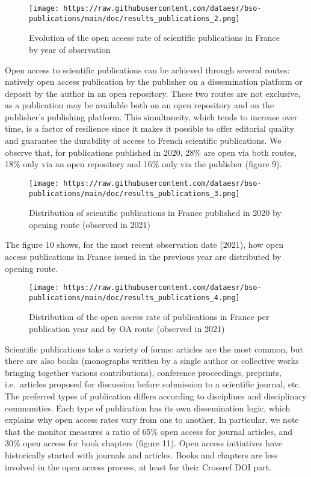\documentclass[
]{article}
\begin{document}
\begin{figure}
\centering
\texttt{[image: https://raw.githubusercontent.com/dataesr/bso-publications/main/doc/results\_publications\_2.png]}
\caption{Evolution of the open access rate of scientific publications in
France by year of observation}
\end{figure}

Open access to scientific publications can be achieved through several
routes: natively open access publication by the publisher on a
dissemination platform or deposit by the author in an open repository.
These two routes are not exclusive, as a publication may be available
both on an open repository and on the publisher's publishing platform.
This simultaneity, which tends to increase over time, is a factor of
resilience since it makes it possible to offer editorial quality and
guarantee the durability of access to French scientific publications. We
observe that, for publications published in 2020, 28\% are open via both
routes, 18\% only via an open repository and 16\% only via the publisher
(figure 9).

\begin{figure}
\centering
\texttt{[image: https://raw.githubusercontent.com/dataesr/bso-publications/main/doc/results\_publications\_3.png]}
\caption{Distribution of scientific publications in France published in
2020 by opening route (observed in 2021)}
\end{figure}

The figure 10 shows, for the most recent observation date (2021), how
open access publications in France issued in the previous year are
distributed by opening route.

\begin{figure}
\centering
\texttt{[image: https://raw.githubusercontent.com/dataesr/bso-publications/main/doc/results\_publications\_4.png]}
\caption{Distribution of the open access rate of publications in France
per publication year and by OA route (observed in 2021)}
\end{figure}

Scientific publications take a variety of forms: articles are the most
common, but there are also books (monographs written by a single author
or collective works bringing together various contributions), conference
proceedings, preprints, i.e.~articles proposed for discussion before
submission to a scientific journal, etc. The preferred types of
publication differs according to disciplines and disciplinary
communities. Each type of publication has its own dissemination logic,
which explains why open access rates vary from one to another. In
particular, we note that the monitor measures a ratio of 65\% open
access for journal articles, and 30\% open access for book chapters
(figure 11). Open access initiatives have historically started with
journals and articles. Books and chapters are less involved in the open
access process, at least for their Crossref DOI part.
\end{document}
